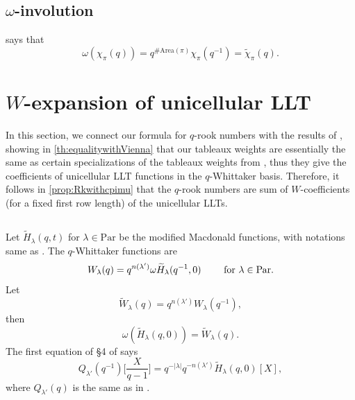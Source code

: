 \documentclass[12pt,reqno]{amsart}
\theoremstyle{plain}
\theoremstyle{definition}
\theoremstyle{remark}
\theoremstyle{example}
\numberwithin{equation}{section}
\newcommand\Par{\mathrm{Par}}
\newcommand{\Area}{\mathrm{Area}}
\begin{document}
\subsection{$\omega$-involution}
\cite[Proposition 3.4]{Carlsson-Mellit-Shuffle} says that \begin{equation}\label{eq:omegachipi}
	\omega(\chi_\pi(q)) = q^{\# \Area(\pi)} \chi_\pi(q^{-1}) = \widetilde{\chi}_\pi(q).
\end{equation}







\section{$W$-expansion of unicellular LLT}

In this section, we connect our formula for $q$-rook numbers with the results of \cite{GMRWW_Macexpansion}, showing in \autoref{th:equalitywithVienna} that our tableaux weights are essentially the same as certain specializations of the tableaux weights from \cite{GMRWW_Macexpansion}, thus they give the coefficients of unicellular LLT functions in the $q$-Whittaker basis. Therefore, it follows in \autoref{prop:Rkwithcpimu} that the $q$-rook numbers are sum of $W$-coefficients (for a fixed first row length) of the unicellular LLTs.

\subsection{}Let $\widetilde{H}_\lambda(q,t)$ for $\lambda \in \Par$ be the modified Macdonald functions, with notations same as \cite{HHL-I}. The $q$-Whittaker functions are \cite{BergeronqWhittaker} $$ W_\lambda(q) = q^{n(\lambda')}\omega\widetilde{H}_{\lambda}(q^{-1},0) \qquad \hbox{ for } \lambda \in \Par.$$ 
Let \begin{equation}\label{eq:tildeWdef}
	\widetilde{W}_\lambda(q) = q^{n(\lambda')}W_\lambda(q^{-1}),
\end{equation}
then \begin{equation}\label{eq:omegatildeH=tildeW}
	\omega(\widetilde{H}_\lambda(q,0)) = \widetilde{W}_\lambda(q).
\end{equation} 
The first equation of \S4 of \cite{GMRWW_Macexpansion} says 
\begin{equation}\label{eq:QprimeplethysmtotildeH}
	Q_{\lambda'}(q^{-1})\bigg[\dfrac{X}{q-1}\bigg] = q^{-|\lambda|}q^{-n(\lambda')}\widetilde{H}_\lambda(q,0)[X],
\end{equation} where $Q_{\lambda'}(q)$ is the same as in \cite[Chapter III]{MacMainBook}.
\end{document}

